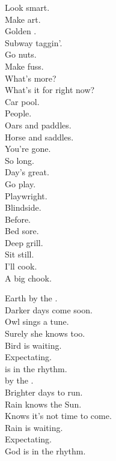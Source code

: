 Look smart. \\
Make art. \\
Golden . \\
Subway taggin'. \\
Go nuts. \\
Make fuss. \\
What's more? \\
What's it for right now? \\

Car pool. \\
People. \\
Oars and paddles. \\
Horse and saddles. \\
You're gone. \\
So long. \\
Day's great. \\
Go play. \\

Playwright. \\
Blindside. \\
Before. \\
Bed sore. \\
Deep grill. \\
Sit still. \\
I'll cook. \\
A big chook. \\




Earth by the . \\
Darker days come soon. \\
Owl sings a tune. \\
Surely she knows too. \\

Bird is waiting. \\
Expectating. \\
 is in the rhythm. \\

 by the . \\
Brighter days to run. \\
Rain knows the Sun. \\
Knows it's not time to come. \\

Rain is waiting. \\
Expectating. \\
God is in the rhythm. \\

